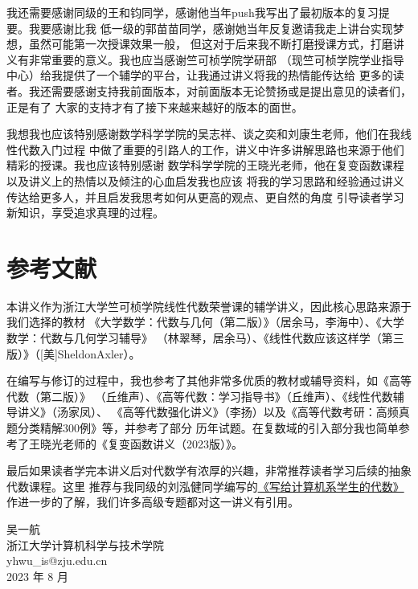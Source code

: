 我还需要感谢同级的王和钧同学，感谢他当年push我写出了最初版本的复习提要。我要感谢比我
低一级的郭苗苗同学，感谢她当年反复邀请我走上讲台实现梦想，虽然可能第一次授课效果一般，
但这对于后来我不断打磨授课方式，打磨讲义有非常重要的意义。我也应当感谢竺可桢学院学研部
（现竺可桢学院学业指导中心）给我提供了一个辅学的平台，让我通过讲义将我的热情能传达给
更多的读者。我还需要感谢支持我前面版本，对前面版本无论赞扬或是提出意见的读者们，正是有了
大家的支持才有了接下来越来越好的版本的面世。

我想我也应该特别感谢数学科学学院的吴志祥、谈之奕和刘康生老师，他们在我线性代数入门过程
中做了重要的引路人的工作，讲义中许多讲解思路也来源于他们精彩的授课。我也应该特别感谢
数学科学学院的王晓光老师，他在复变函数课程以及讲义上的热情以及倾注的心血启发我也应该
将我的学习思路和经验通过讲义传达给更多人，并且启发我思考如何从更高的观点、更自然的角度
引导读者学习新知识，享受追求真理的过程。

\section*{参考文献}
本讲义作为浙江大学竺可桢学院线性代数荣誉课的辅学讲义，因此核心思路来源于我们选择的教材
《大学数学：代数与几何（第二版）》（居余马，李海中）、《大学数学：代数与几何学习辅导》
（林翠琴，居余马）、《线性代数应该这样学（第三版）》（[美]Sheldon\enspace Axler）。

在编写与修订的过程中，我也参考了其他非常多优质的教材或辅导资料，如《高等代数（第二版）》
（丘维声）、《高等代数：学习指导书》（丘维声）、《线性代数辅导讲义》（汤家凤）、
《高等代数强化讲义》（李扬）以及《高等代数考研：高频真题分类精解300例》等，并参考了部分
历年试题。在复数域的引入部分我也简单参考了王晓光老师的《复变函数讲义（2023版）》。

最后如果读者学完本讲义后对代数学有浓厚的兴趣，非常推荐读者学习后续的抽象代数课程。这里
推荐与我同级的刘泓健同学编写的\href{https://frightenedfoxcn.github.io/notes/series/alg-for-cs/}
{《写给计算机系学生的代数》}作进一步的了解，我们许多高级专题都对这一讲义有引用。

\begin{flushright}
    \kaishu
    吴一航 \\
    浙江大学计算机科学与技术学院 \\
    yhwu\_is@zju.edu.cn \\
    2023 年 8 月
\end{flushright}
